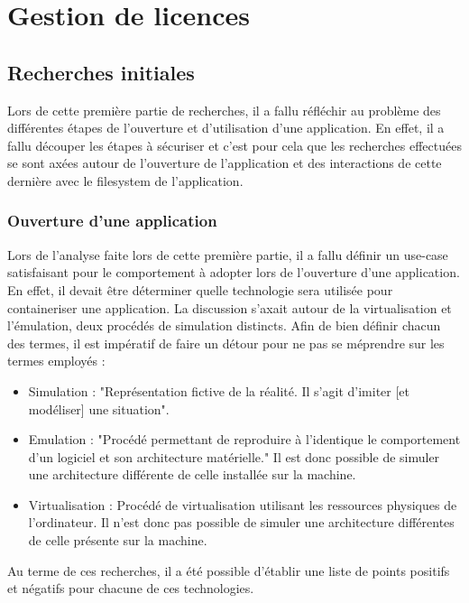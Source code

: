\chapter{Gestion de licences}
\label{ch:softs}


\section{Recherches initiales}
Lors de cette première partie de recherches, il a fallu réfléchir au problème des différentes étapes de l'ouverture et d'utilisation d'une application.
En effet, il a fallu découper les étapes à sécuriser et c'est pour cela que les recherches effectuées se sont axées autour de l'ouverture de l'application et des interactions de cette dernière avec le \gls{filesystem} de l'application.

\subsection{Ouverture d'une application}
Lors de l'analyse faite lors de cette première partie, il a fallu définir un use-case satisfaisant pour le comportement à adopter lors de l'ouverture d'une application.
En effet, il devait être déterminer quelle technologie sera utilisée pour containeriser une application.
La discussion s'axait autour de la virtualisation et l'émulation, deux procédés de simulation distincts.
Afin de bien définir chacun des termes, il est impératif de faire un détour pour ne pas se méprendre sur les termes employés : 

\begin{itemize}
	\item Simulation : "Représentation fictive de la réalité. Il s'agit d'imiter [et modéliser] une situation"\cite{sev}.
	\item Emulation : "Procédé permettant de reproduire à l'identique le comportement d’un logiciel et son architecture matérielle." \cite{sev} Il est donc possible de simuler une architecture différente de celle installée sur la machine.
	\item Virtualisation : Procédé de virtualisation utilisant les ressources physiques de l'ordinateur. Il n'est donc pas possible de simuler une architecture différentes de celle présente sur la machine.
\end{itemize}
 
Au terme de ces recherches, il a été possible d'établir une liste de points positifs et négatifs pour chacune de ces technologies.


